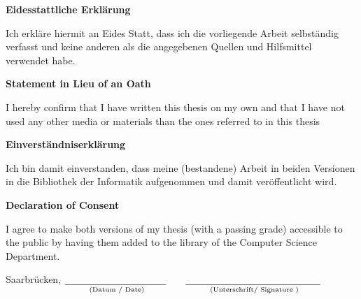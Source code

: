 \documentclass[12pt]{report}
\begin{document}
\begin{center}
\textbf{Eidesstattliche Erklärung}
\end{center}

Ich erkläre hiermit an Eides Statt, dass ich die vorliegende Arbeit selbständig verfasst und keine anderen als die angegebenen Quellen und Hilfsmittel verwendet habe.


\vspace{2.5cm}

\begin{center}
\textbf{Statement in Lieu of an Oath}
\end{center}

I hereby confirm that I have written this thesis on my own and that I have not used any other media or materials than the ones referred to in this thesis

\vspace{1.5cm}

\begin{center}
\textbf{Einverständniserklärung}
\end{center}

Ich bin damit einverstanden, dass meine (bestandene) Arbeit in beiden Versionen in die Bibliothek der Informatik aufgenommen und damit veröffentlicht wird.


\vspace{1.5cm}

\begin{center}
\textbf{Declaration of Consent}
\end{center}

I agree to make both versions of my thesis (with a passing grade) accessible to the public by having them added to the library of the Computer Science Department.


\vspace{2.5cm}

Saarbrücken, $\underset{\text{ (Datum / Date)}}{\underline{ \hspace{0.3\textwidth}}}  \qquad \underset{\text{ (Unterschrift/ Signature )}}{\underline{ \hspace{0.4\textwidth}}} $ 


\tableofcontents
\newpage

















{}

\end{document}

